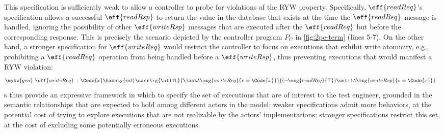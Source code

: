 This specification is sufficiently weak to allow a controller to probe
for violations of the RYW property.  Specifically, $\eff{readReq}$'s
specification allows a successful $\eff{readRsp}$ to return the value
in the database that exists at the time the $\eff{readReq}$ message is
handled, ignoring the possibility of other $\eff{writeRsp}$ messages
that are executed after the $\eff{readReq}$ but before the
corresponding response.  This is precisely the scenario depicted by
the controller program $P_C$ in \autoref{fig:2pc-term} (lines 5-7).
On the other hand, a stronger specification for $\eff{writeReq}$ would
restrict the controller to focus on executions that exhibit write
atomicity, e.g., prohibiting a $\eff{readReq}$ operation from being
handled before a $\eff{writeRsp}$, thus preventing executions that
would manifest a RYW violation:
{\footnotesize
  \begin{align*}
    \mykw{gen}~ \eff{writeReq} ~:~ &  \Code{x}\hasnty{int} \sarr \rg{\allTL}{\lastA\msg{writeReq}{v = \Code{x}}}{(\neg \msg{readReq}{\top}) \untilA \msg{writeRsp}{v = \Code{x}}}
  \end{align*}}\noindent
\PAT{}s thus provide an expressive framework in which to specify the
set of executions that are of interest to the test engineer, grounded
in the semantic relationships that are expected to hold among
different actors in the model: weaker specifications admit more
behaviors, at the potential cost of trying to explore executions that
are not realizable by the actors' implementations; stronger specifications
restrict this set, at the cost of excluding some potentially erroneous executions.







